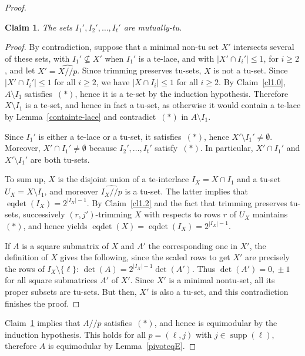 \documentclass[11pt,a4paper]{amsart}
\renewcommand*{\geq}{\geqslant}
\renewcommand*{\leq}{\leqslant}
\theoremstyle{plain}
\newtheorem{claimnumb}{Claim}[theorem]{\itshape}{\rmfamily}
\theoremstyle{definition}
\DeclareMathOperator{\supp}{supp}
\DeclareMathOperator{\eqdet}{eqdet}
\newcommand{\trim}{/\!\!/}
\begin{document}
\begin{proof}
\begin{claimnumb}\label{cl1.5}
The sets $I_1',I_2',\dots,I_t'$ are mutually-tu.
\end{claimnumb}
\begin{proof}
By contradiction, suppose that a minimal non-tu set $X'$ intersects several of these sets, with $I_1'\not\subseteq X'$ when $I_1'$ is a te-lace, and with $|X'\cap I_i'|\leq 1$, for $i\geq 2$, and let $X'=\widehat{X\trim p}$.
Since trimming preserves tu-sets, $X$ is not a tu-set.
Since $|X'\cap I_i'|\leq 1$ for all $i\geq 2$, we have $|X\cap I_i|\leq 1$ for all $i\geq 2$.
By Claim~\ref{cl1.0}, $A\setminus I_1$ satisfies~$(\ast)$, hence it is a te-set by the induction hypothesis.
Therefore $X\setminus I_1$ is a te-set, and hence in fact a tu-set, as otherwise it would contain a te-lace by Lemma~\ref{containte-lace} and contradict~$(\ast)$ in $A\setminus I_1$.

Since $I_1'$ is either a te-lace or a tu-set, it satisfies~$(\ast)$, hence $X'\setminus I_1'\neq \emptyset$.
Moreover, $X'\cap I_1'\neq \emptyset$ because $I_2',\dots,I_t'$ satisfy~$(\ast)$.
In particular, $X'\cap I_1'$ and $X'\setminus I_1'$ are both tu-sets.

To sum up, $X$ is the disjoint union of a te-interlace $I_X=X\cap I_1$ and a tu-set  $U_X=X\setminus I_1$, and moreover $\widehat{I_X\trim p}$ is a tu-set.
The latter implies that $\eqdet (I_X) = 2^{|I_X|-1}$.
By Claim~\ref{cl1.2} and the fact that trimming preserves tu-sets, successively $(r,j')$-trimming $X$ with respects to rows $r$ of $U_X$ maintains~$(\ast)$, and hence yields $\eqdet (X) = \eqdet (I_X) = 2^{|I_X|-1}$.

If $A$ is a square submatrix of $X$ and $A'$ the corresponding one in $X'$, the definition of $X$ gives the following, since the scaled rows to get $X'$ are precisely the rows of $I_X\setminus\{\ell\}$: $\det (A) = 2^{|I_X|-1}\det(A')$.
Thus $\det(A')=0,\!\pm1$ for all square submatrices $A'$ of $X'$.
Since $X'$ is a minimal nontu-set, all its proper subsets are tu-sets.
But then, $X'$ is also a tu-set, and this contradiction finishes the proof.
\end{proof}

Claim~\ref{cl1.5} implies that $A\trim p$ satisfies~$(\ast)$, and hence is equimodular by the induction hypothesis.
This holds for all $p=(\ell,j)$ with $j\in\supp(\ell)$, therefore $A$ is equimodular by Lemma~\ref{pivoteqE}.
\end{proof}
\end{document}

